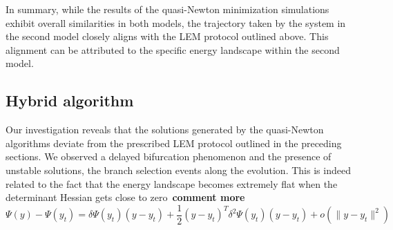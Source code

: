 In summary, while the results of the quasi-Newton minimization simulations exhibit overall similarities in both models, the trajectory taken by the system in the second model closely aligns with the LEM protocol outlined above. This alignment can be attributed to the specific energy landscape within the second model.


\subsection{Hybrid algorithm}
Our investigation reveals that the solutions generated by the quasi-Newton algorithms deviate from the prescribed LEM protocol outlined in the preceding sections. We observed a delayed bifurcation phenomenon and the presence of unstable solutions,  the branch selection events along the evolution.  This is indeed related to the fact that the energy landscape becomes extremely flat when the determinant Hessian gets close to zero~\textbf{comment more}
$$
\Psi(y)-\Psi(y_t)= \delta\Psi(y_t)(y-y_t)+\frac{1}{2}(y-y_t)^T \delta^2\Psi(y_t)(y-y_t)+o(\|y-y_t\|^2)
$$

